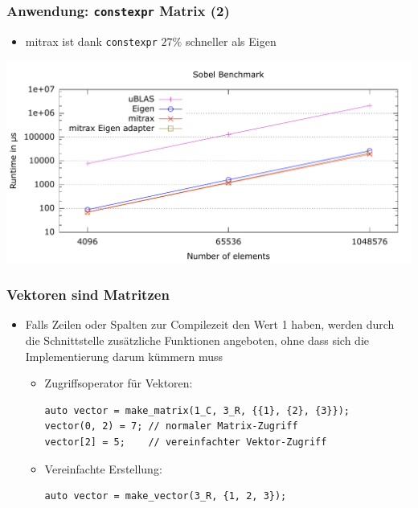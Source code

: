 \documentclass{beamer}
\begin{document}
\begin{frame}
    \frametitle{Anwendung: \texttt{constexpr} Matrix (2)}
    \begin{itemize}
        \item mitrax ist dank \texttt{constexpr} $27\%$ schneller als Eigen
    \end{itemize}
    \includegraphics[width=\textwidth]{images/sobel2.pdf}
\end{frame}
\begin{frame}[fragile]
    \frametitle{Vektoren sind Matritzen}
    \begin{itemize}
        \item Falls Zeilen oder Spalten zur Compilezeit den Wert 1 haben, werden durch die Schnittstelle zusätzliche Funktionen angeboten, ohne dass sich die Implementierung darum kümmern muss
        \begin{itemize}
            \item Zugriffsoperator für Vektoren:
\begin{verbatim}
auto vector = make_matrix(1_C, 3_R, {{1}, {2}, {3}});
vector(0, 2) = 7; // normaler Matrix-Zugriff
vector[2] = 5;    // vereinfachter Vektor-Zugriff
\end{verbatim}
            \item Vereinfachte Erstellung:
\begin{verbatim}
auto vector = make_vector(3_R, {1, 2, 3});
\end{verbatim}
        \end{itemize}
    \end{itemize}
\end{frame}
\end{document}
